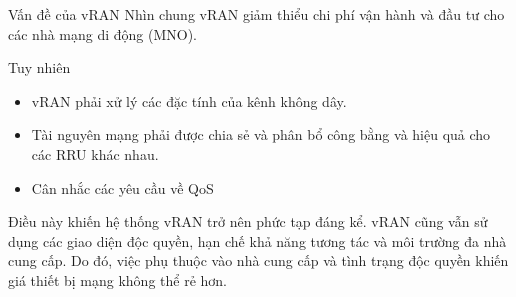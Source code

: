 \begin{frame}{Vấn đề của vRAN}
  Nhìn chung vRAN giảm thiểu chi phí vận hành và đầu tư cho các nhà mạng di động (MNO). 
  
  
  Tuy nhiên 
  \begin{itemize}
    \item vRAN phải xử lý các đặc tính của kênh không dây.
    \item Tài nguyên mạng phải được chia sẻ và phân bổ công bằng và hiệu quả cho các RRU khác nhau.
    \item Cân nhắc các yêu cầu về QoS
  \end{itemize}









  Điều này khiến hệ thống vRAN trở nên phức tạp đáng kể. vRAN cũng vẫn sử dụng các giao diện độc quyền, hạn chế khả năng tương tác và môi trường đa nhà cung cấp. Do đó, việc phụ thuộc vào nhà cung cấp và tình trạng độc quyền khiến giá thiết bị mạng không thể rẻ hơn.
\end{frame}